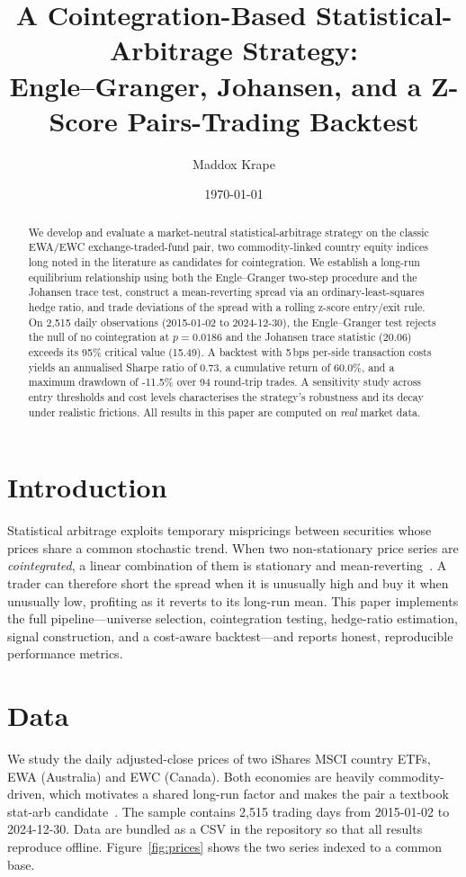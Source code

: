 \documentclass[11pt]{article}
\title{\textbf{A Cointegration-Based Statistical-Arbitrage Strategy:\\
Engle--Granger, Johansen, and a Z-Score Pairs-Trading Backtest}}
\author{Maddox Krape}
\date{\today}
\begin{document}
\maketitle

\begin{abstract}
We develop and evaluate a market-neutral statistical-arbitrage strategy on the
classic EWA/EWC exchange-traded-fund pair, two commodity-linked country equity
indices long noted in the literature as candidates for cointegration. We
establish a long-run equilibrium relationship using both the Engle--Granger
two-step procedure and the Johansen trace test, construct a mean-reverting
spread via an ordinary-least-squares hedge ratio, and trade deviations of the
spread with a rolling z-score entry/exit rule. On 2,515 daily
observations (2015-01-02 to 2024-12-30), the Engle--Granger test rejects the
null of no cointegration at $p=0.0186$ and the Johansen
trace statistic (20.06) exceeds its 95\% critical value
(15.49). A backtest with 5\,bps
per-side transaction costs yields an annualised Sharpe ratio of 0.73,
a cumulative return of 60.0\%, and a maximum drawdown of
-11.5\% over 94 round-trip trades. A
sensitivity study across entry thresholds and cost levels characterises the
strategy's robustness and its decay under realistic frictions. All results in this paper are computed on \emph{real} market data.
\end{abstract}

\section{Introduction}
Statistical arbitrage exploits temporary mispricings between securities whose
prices share a common stochastic trend. When two non-stationary price series are
\emph{cointegrated}, a linear combination of them is stationary and
mean-reverting~\cite{engle1987,vidyamurthy2004}. A trader can therefore short the
spread when it is unusually high and buy it when unusually low, profiting as it
reverts to its long-run mean. This paper implements the full pipeline---universe
selection, cointegration testing, hedge-ratio estimation, signal construction,
and a cost-aware backtest---and reports honest, reproducible performance metrics.

\section{Data}
We study the daily adjusted-close prices of two iShares MSCI country ETFs, EWA
(Australia) and EWC (Canada). Both economies are heavily commodity-driven, which
motivates a shared long-run factor and makes the pair a textbook stat-arb
candidate~\cite{chan2013}. The sample contains 2,515 trading days from
2015-01-02 to 2024-12-30. Data are bundled as a CSV in the repository so that
all results reproduce offline. Figure~\ref{fig:prices} shows the two series
indexed to a common base.
\end{document}
